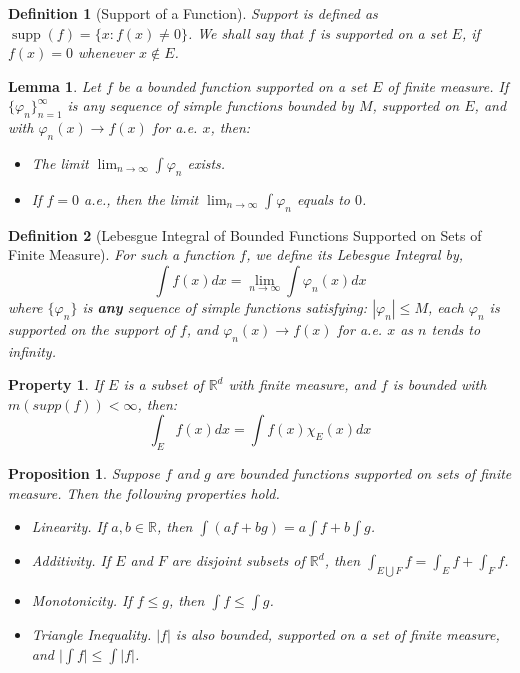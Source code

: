 \documentclass{report}
\theoremstyle{upthm}
\newtheorem{defn}{Definition}
\newtheorem{lemma}{Lemma}
\newtheorem{prop}{Proposition}
\newtheorem{property}{Property}
\newcommand{\reals}{\mathbb{R}}
\newcommand{\set}[1]{\big\lbrace #1 \big\rbrace}
\newcommand{\union}{\bigcup}
\newcommand{\vl}{\Big|}
\newcommand{\supp}{\mathop{\text{supp}}}
\begin{document}
\begin{defn}[Support of a Function]
	Support is defined as $\supp(f) = \set{x : f(x) \neq 0} $. We shall say that $f$ is supported on a set $E$, if $f(x) = 0$ whenever $x \notin E$.
\end{defn}

\begin{lemma}
	Let $f$ be a bounded function supported on a set $E$ of finite measure. If $\set{\varphi_n}_{n=1}^\infty$ is any sequence of simple functions bounded by $M$, supported on $E$, and with $ \varphi_n(x) \rightarrow f(x)$ for a.e. $x$, then:
	\begin{itemize}
		\item The limit $\lim_{n \rightarrow \infty} \int \varphi_n$ exists.
		\item If $f = 0$ a.e., then the limit $\lim_{n \rightarrow \infty} \int \varphi_n$ equals to $0$.
	\end{itemize}
\end{lemma}

\begin{defn}[Lebesgue Integral of Bounded Functions Supported on Sets of Finite Measure]
For such a function $f$, we define its Lebesgue Integral by,
$$ \int f(x) dx = \lim_{n \rightarrow \infty} \int \varphi_n(x) dx $$
where $\set{\varphi_n}$ is {\bf any} sequence of simple functions satisfying: $| \varphi_n | \leq M$, each $\varphi_n$ is supported on the support of $f$, and $\varphi_n(x) \rightarrow f(x)$ for a.e. $x$ as $n$ tends to infinity.  
\end{defn}

\begin{property}
	If $E$ is a subset of $\reals^d$ with finite measure, and $f$ is bounded with $m(supp(f)) < \infty$, then:
	$$ \int_E f(x) dx = \int f(x) \chi_E(x) dx $$
\end{property}

\begin{prop}
	Suppose $f$ and $g$ are bounded functions supported on sets of finite measure. Then the following properties hold. 
	\begin{itemize}
		\item Linearity. If $a, b \in \reals$, then $\int (af + bg) = a \int f + b \int g$.
		\item Additivity. If $E$ and $F$ are disjoint subsets of $\reals^d$, then $\int_{E \union F} f = \int_E f + \int_F f$.
		\item Monotonicity. If $f \leq g$, then $\int f \leq \int g$.
		\item Triangle Inequality. $|f|$ is also bounded, supported on a set of finite
		measure, and $\vl \int f \vl \leq \int |f|$.
	\end{itemize}
\end{prop}
\end{document}
